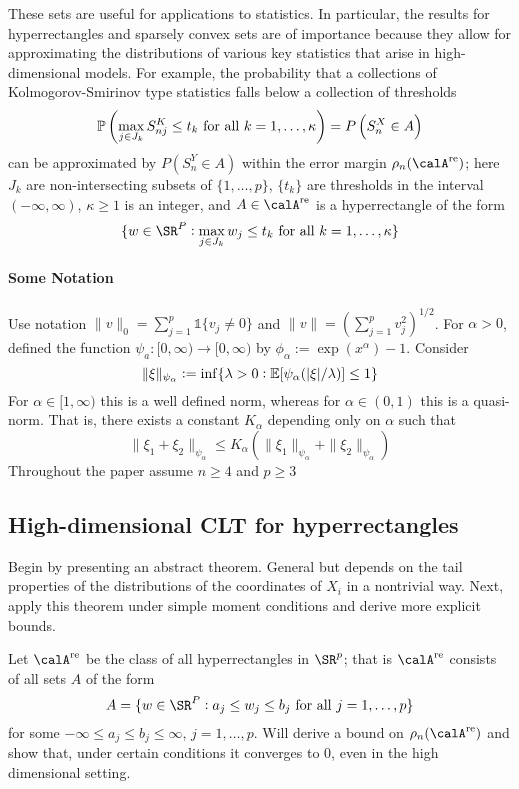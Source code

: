 These sets are useful for applications to statistics. In particular, the results for hyperrectangles and sparsely convex sets are of importance because they allow for approximating the distributions of various key statistics that arise in high-dimensional models. For example, the probability that a collections of Kolmogorov-Smirinov type statistics falls below a collection of thresholds
\[\P\left(\max_{j\in J_k} S_{nj}^K \leq t_k\text{ for all }k = 1, \dots, \kappa \right) = P\left(S_n^X \in A\right)\]
can be approximated by $P(S_n^Y \in A)$ within the error margin $\rho_n(\calA^{\text{re}})$; here $J_k$ are non-intersecting subsets of $\{1, \dots, p\}$, $\{t_k\}$ are thresholds in the interval $(-\infty, \infty)$, $\kappa \geq 1$ is an integer, and $A\in \calA^{\text{re}}$ is a hyperrectangle of the form 
\[\{w\in \SR^P: \max_{j\in J_k} w_j \leq t_k \text{ for all }k=1, \dots, \kappa\}\]


\paragraph{Some Notation} 

Use notation $\|v\|_0 = \sum_{j=1}^p \mathds{1}\{v_j\neq 0\}$ and $\|v\| = (\sum_{j=1}^p v_j^2)^{1/2}$. For $\alpha > 0$, defined the function $\psi_a :[0, \infty) \to [0, \infty)$ by $\phi_\alpha := \exp(x^\alpha) - 1$. Consider 
\[ \|\xi\|_{\psi_\alpha} := \inf \{\lambda > 0: \E[\psi_\alpha(|\xi|/\lambda)] \leq 1 \} \]
For $\alpha \in [1,\infty)$ this is a well defined norm, whereas for $\alpha \in (0,1)$ this is a quasi-norm. That is, there exists a constant $K_\alpha$ depending only on $\alpha$ such that 
\[\|\xi_1 + \xi_2\|_{\psi_\alpha} \leq K_\alpha (\|\xi_1\|_{\psi_\alpha} + \|\xi_2\|_{\psi_\alpha})\]
Throughout the paper assume $n\geq 4$ and $p \geq 3$

\subsection{High-dimensional CLT for hyperrectangles}

Begin by presenting an abstract theorem. General but depends on the tail properties of the distributions of the coordinates of $X_i$ in a nontrivial way. Next, apply this theorem under simple moment conditions and derive more explicit bounds. 

Let $\calA^{\text{re}}$ be the class of all hyperrectangles in $\SR^p$; that is $\calA^{\text{re}}$ consists of all sets $A$ of the form 
\begin{equation}
	\label{eq:cck17-4}
	A = \{w \in \SR^P: a_j \leq w_j \leq b_j\text{ for all }j = 1, \dots, p\}
\end{equation}
for some $-\infty \leq a_j \leq b_j \leq \infty$, $j = 1, \dots, p$. Will derive a bound on $\rho_n(\calA^{\text{re}})$ and show that, under certain conditions it converges to 0, even in the high dimensional setting. 


